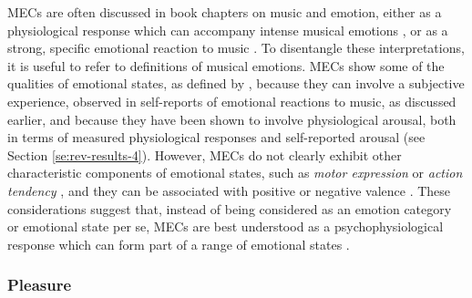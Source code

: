 MECs are often discussed in book chapters on music and emotion, either as a physiological response which can accompany intense musical emotions \parencite{juslin2016}, or as a strong, specific emotional reaction to music \parencite{eerola2018, hunter2010}. To disentangle these interpretations, it is useful to refer to definitions of musical emotions. MECs show some of the qualities of emotional states, as defined by \textcite{juslin2010}, because they can involve a subjective experience, observed in self-reports of emotional reactions to music, as discussed earlier, and because they have been shown to involve physiological arousal, both in terms of measured physiological responses and self-reported arousal (see Section \ref{se:rev-results-4}). However, MECs do not clearly exhibit other characteristic components of emotional states, such as \emph{motor expression} or \emph{action tendency} \parencite{juslin2010, scherer2009}, and they can be associated with positive or negative valence \parencite[e.g.,][]{bannister2019, maruskin2012}. These considerations suggest that, instead of being considered as an emotion category or emotional state per se, MECs are best understood as a psychophysiological response which can form part of a range of emotional states \parencite{grewe2011, juslin2019}.

\subsubsection{Pleasure}

